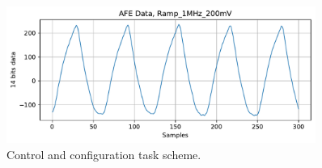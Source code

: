 \begin{figure}[htbp]
\centering %
\includegraphics[width=0.9\textwidth,origin=c,angle=0]{Images/DaphneAFETest/Ramp_1MHz_200mV.pdf}
\caption{\label{fig:InitPeriTask} Control and configuration task scheme.}
\end{figure} 
        

        

        
